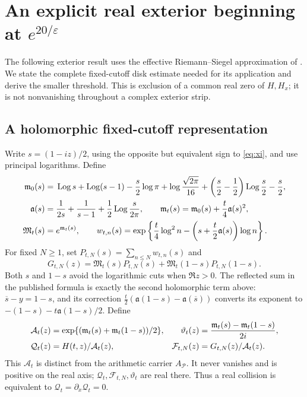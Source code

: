 \section{An explicit real exterior beginning at \texorpdfstring{$e^{20/\varepsilon}$}{exp(20/epsilon)}}
\label{sec:outer}

The following exterior result uses the effective Riemann--Siegel
approximation of \cite[Theorem 1.3]{Polymath}. We state the complete
fixed-cutoff disk estimate needed for its application and derive the
smaller threshold. This is exclusion of a common real zero of $H,H_x$;
it is not nonvanishing throughout a complex exterior strip.

\subsection{A holomorphic fixed-cutoff representation}

Write $s=(1-iz)/2$, using the opposite but equivalent sign to
\eqref{eq:xi}, and use principal logarithms. Define
\begin{align}
 \mathfrak m_0(s)={}&\operatorname{Log} s+\operatorname{Log}(s-1)-\frac s2\log\pi
 +\log\frac{\sqrt{2\pi}}{16}
 +\left(\frac s2-\frac12\right)\operatorname{Log}\frac s2-\frac s2,\notag\\
 \mathfrak a(s)={}&\frac1{2s}+\frac1{s-1}
                  +\frac12\operatorname{Log}\frac{s}{2\pi},\qquad
 \mathfrak m_t(s)=\mathfrak m_0(s)+\frac t4\mathfrak a(s)^2,\notag\\
 \mathfrak M_t(s)={}&e^{\mathfrak m_t(s)},\qquad
 w_{t,n}(s)=
 \exp\left\{\frac t4\log^2n-
       \left(s+\frac t2\mathfrak a(s)\right)\log n\right\}.
 \label{eq:rs-definitions}
\end{align}
For fixed $N\ge1$, set $P_{t,N}(s)=\sum_{n\le N}w_{t,n}(s)$ and
\[
 G_{t,N}(z)=\mathfrak M_t(s)P_{t,N}(s)
           +\mathfrak M_t(1-s)P_{t,N}(1-s).
\]
Both $s$ and $1-s$ avoid the logarithmic cuts when $\Re z>0$.
The reflected sum in the published formula is exactly the second
holomorphic term above: $\overline s-y=1-s$, and its correction
$\tfrac t2(\mathfrak a(1-s)-\mathfrak a(\overline s))$
converts its exponent to $-(1-s)-t\mathfrak a(1-s)/2$.
Define
\begin{align}
 \mathcal A_t(z)&=\exp\{(\mathfrak m_t(s)+\mathfrak m_t(1-s))/2\},
 &\vartheta_t(z)&=\frac{\mathfrak m_t(s)-\mathfrak m_t(1-s)}{2i},
 \notag\\
 \mathcal Q_t(z)&=H(t,z)/\mathcal A_t(z),
 &\mathcal F_{t,N}(z)&=G_{t,N}(z)/\mathcal A_t(z).
 \label{eq:rs-normalization}
\end{align}
This $\mathcal A_t$ is distinct from the arithmetic carrier
$A_{\mathcal P}$. It never vanishes and is positive on the real axis;
$\mathcal Q_t,\mathcal F_{t,N},\vartheta_t$ are real there.
Thus a real collision is equivalent to
$\mathcal Q_t=\partial_x\mathcal Q_t=0$.

